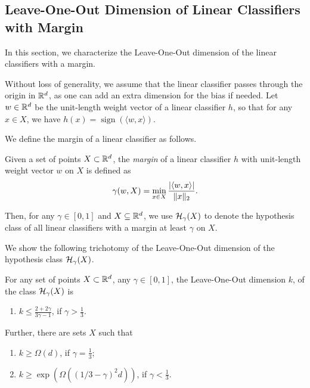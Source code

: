 \subsection{Leave-One-Out Dimension of Linear Classifiers with Margin}\label{sec:realizable_linear_margin}

In this section, we characterize the Leave-One-Out dimension of the linear classifiers with a margin.

Without loss of generality, we assume that the linear classifier passes through the origin in $\mathbb{R}^d$, as one can add an extra dimension for the bias if needed. Let $w \in \mathbb{R}^d$ be the unit-length weight vector of a linear classifier $h$, so that for any $x \in X$, we have $h(x) = \operatorname{sign}(\langle w, x \rangle)$.

We define the margin of a linear classifier as follows. 
\begin{definition}
\label{defn:margin}
    Given a set of points $X \subset \mathbb{R}^d$, the \emph{margin} of a linear classifier $h$ with unit-length weight vector $w$ on $X$ is defined as 
    $$
    \gamma(w,X) = \min_{x \in X} \frac{|\langle w, x\rangle|}{\|x\|_2}.
    $$
\end{definition}
Then, for any $\gamma \in [0,1]$ and $X\subseteq \mathbb{R}^d$, we use $\mathcal{H}_\gamma(X)$ to denote the hypothesis class of all linear classifiers with a margin at least $\gamma$ on $X$.

We show the following trichotomy of the Leave-One-Out dimension of the hypothesis class $\mathcal{H}_\gamma(X)$.

\begin{theorem}\label{thm:Leave-One-Out-linear-realizable}
    For any set of points $X \subset \mathbb{R}^d$, any $\gamma \in [0,1]$, the Leave-One-Out dimension $k$, of the class $\mathcal{H}_\gamma(X)$ is 
    \begin{enumerate}
        \item $k \leq \frac{2+2\gamma}{3\gamma -1}$,  if $\gamma > \frac{1}{3}$.
    \end{enumerate}
    Further, there are sets $X$ such that 
    \begin{enumerate}
        \item $k \geq \Omega(d)$, if $\gamma = \frac{1}{3}$;
        \item $k \geq \exp(\Omega((1/3 - \gamma)^2d))$, if $\gamma < \frac{1}{3}$.
    \end{enumerate}
    
\end{theorem}

